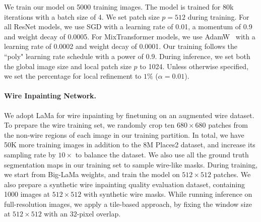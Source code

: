 We train our model on 5000 training images. The model is trained for 80k iterations with a batch size of 4. We set patch size $p = 512$ during training. 
For all ResNet models, we use SGD with a learning rate of 0.01, a momentum of 0.9 and weight decay of 0.0005. For MixTransformer models, we use AdamW~\cite{adamw} with a learning rate of 0.0002 and weight decay of 0.0001. Our training follows the ``poly" learning rate schedule with a power of 0.9. During inference, we set both the global image size and local patch size $p$ to 1024. Unless otherwise specified, we set the percentage for local refinement to $1\%$ ($\alpha=0.01$).


\vspace{-4mm}
\paragraph{Wire Inpainting Network.}
We adopt LaMa \cite{suvorov2022resolution} for wire inpainting by finetuning on an augmented wire dataset. 
To prepare the wire training set, we randomly crop ten $680\times680$ patches from the non-wire regions of each image in our training partition. In total, we have 50K more training images in addition to 
the 8M
Places2 \cite{zhou2017places} dataset, and increase its sampling rate %
by $10\times$
to balance the dataset. We also use all the ground truth segmentation maps in our training set to sample wire-like masks. During training, we start from Big-LaMa weights, and train the model on $512\times 512$ patches. We also prepare a synthetic wire inpainting quality evaluation dataset, containing 1000 images at $512\times 512$ with synthetic wire masks.
While running inference on full-resolution images, we apply a tile-based approach, by fixing the window size at $512\times 512$ with an $32$-pixel overlap. 

